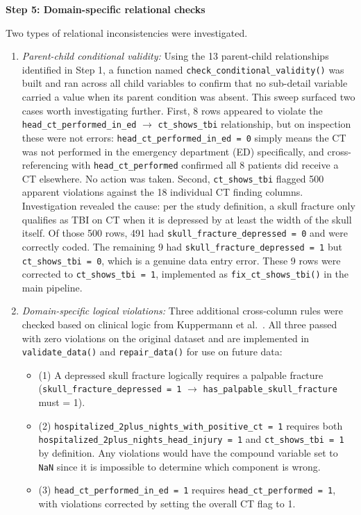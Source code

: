 \documentclass[11pt,letterpaper]{article}
\begin{document}
\textbf{Step 5: Domain-specific relational checks}

Two types of relational inconsistencies were investigated. 
\begin{enumerate}
    \item \textit{Parent-child conditional validity:} Using the 13 parent-child relationships identified in Step 1, a function named \texttt{check\_conditional\_validity()} was built and ran across all child variables to confirm that no sub-detail variable carried a value when its parent condition was absent. This sweep surfaced two cases worth investigating further. First, 8 rows appeared to violate the \texttt{head\_ct\_performed\_in\_ed} $\rightarrow$ \texttt{ct\_shows\_tbi} relationship, but on inspection these were not errors: \texttt{head\_ct\_performed\_in\_ed = 0} simply means the CT was not performed in the emergency department (ED) specifically, and cross-referencing with \texttt{head\_ct\_performed} confirmed all 8 patients did receive a CT elsewhere. No action was taken. Second, \texttt{ct\_shows\_tbi} flagged 500 apparent violations against the 18 individual CT finding columns. Investigation revealed the cause: per the study definition, a skull fracture only qualifies as TBI on CT when it is depressed by at least the width of the skull itself. Of those 500 rows, 491 had \texttt{skull\_fracture\_depressed = 0} and were correctly coded. The remaining 9 had \texttt{skull\_fracture\_depressed = 1} but \texttt{ct\_shows\_tbi = 0}, which is a genuine data entry error. These 9 rows were corrected to \texttt{ct\_shows\_tbi = 1}, implemented as \texttt{fix\_ct\_shows\_tbi()} in the main pipeline.
    \item \textit{Domain-specific logical violations:} Three additional cross-column rules were checked based on clinical logic from Kuppermann et al.~\cite{kuppermann2009}. All three passed with zero violations on the original dataset and are implemented in \texttt{validate\_data()} and \texttt{repair\_data()} for use on future data: 
    \begin{itemize}[leftmargin=*, label=\small\textbullet]
    \raggedright
        \item (1) A depressed skull fracture logically requires a palpable fracture (\texttt{skull\_fracture\_depressed = 1} $\rightarrow$ \texttt{has\_palpable\_skull\_fracture} must = 1).
        \item (2) \texttt{hospitalized\_2plus\_nights\_with\_positive\_ct = 1} requires both \texttt{hospitalized\_2plus\_nights\_head\_injury = 1} and \texttt{ct\_shows\_tbi = 1} by definition. Any violations would have the compound variable set to \texttt{NaN} since it is impossible to determine which component is wrong.
        \item (3) \texttt{head\_ct\_performed\_in\_ed = 1} requires \texttt{head\_ct\_performed = 1}, with violations corrected by setting the overall CT flag to 1.
    \end{itemize}
\end{enumerate}
\end{document}
